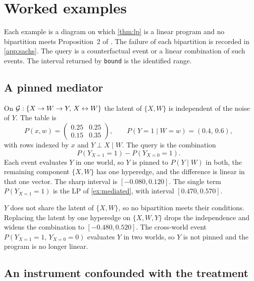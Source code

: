 \section{Worked examples}
\label{sec:illustrations}

Each example is a diagram on which \cref{thm:lp} is a linear program and no bipartition meets Proposition~2 of \citet{symbolicbounds2023general}. The failure of each bipartition is recorded in \cref{app:sachs}. The query is a counterfactual event or a linear combination of such events. The interval returned by \texttt{bound} is the identified range.

\subsection{A pinned mediator}
\label{sec:ill-mediated}
\label{sec:ill-solver}

On $\mathcal{G}:\{X\to W\to Y,\, X\leftrightarrow W\}$ the latent of $\{X,W\}$ is independent of the noise of $Y$. The table is
\begin{equation}
\label{eq:re3}
P(x,w)=\begin{pmatrix}0.25 & 0.25\\ 0.15 & 0.35\end{pmatrix},
\qquad
P(Y{=}1\mid W{=}w)=(0.4,\,0.6),
\end{equation}
with rows indexed by $x$ and $Y\perp X\mid W$. The query is the combination
\[
P(Y_{X=1}{=}1)-P(Y_{X=0}{=}1).
\]
Each event evaluates $Y$ in one world, so $Y$ is pinned to $P(Y\mid W)$ in both, the remaining component $\{X,W\}$ has one hyperedge, and the difference is linear in that one vector. The sharp interval is $[-0.080,0.120]$. The single term $P(Y_{X=1}{=}1)$ is the LP of \cref{ex:mediated}, with interval $[0.470,0.570]$.

$Y$ does not share the latent of $\{X,W\}$, so no bipartition meets their conditions. Replacing the latent by one hyperedge on $\{X,W,Y\}$ drops the independence and widens the combination to $[-0.480,0.520]$. The cross-world event $P(Y_{X=1}{=}1,\,Y_{X=0}{=}0)$ evaluates $Y$ in two worlds, so $Y$ is not pinned and the program is no longer linear.

\subsection{An instrument confounded with the treatment}
\label{sec:ill-designs}

